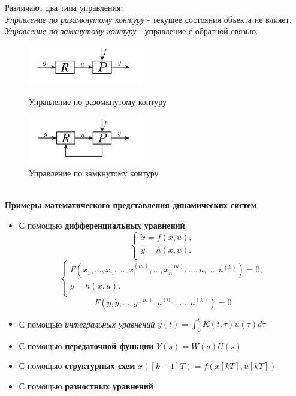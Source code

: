 \documentclass[A4]{article}
\begin{document}
\noindent Различают два типа управления:\\
\emph{Управление по разомкнутому контуру} - текущее состояния объекта не влияет.\\
\emph{Управление по замкнутому контуру} - управление с обратной связью.
\begin{figure}[htbp] 
	\centering 
	\begin{minipage}[t]{0.48\textwidth} 
		\centering 
		\includegraphics[width=5cm]{3} 
		\caption{Управление по разомкнутому контуру}
		\label{fig:3}
	\end{minipage} 
	\begin{minipage}[t]{0.48\textwidth} 
		\centering 
		\includegraphics[width=5cm]{4} 
		\caption{Управление по замкнутому контуру} 
		\label{fig:4}
	\end{minipage} 
\end{figure}
\\
\textbf{Примеры математического представления динамических систем}
\begin{itemize}
	\item С помощью \textbf{дифференциальных уравнений}
	\begin{equation}
	\left\{\begin{array}{cc}
	\dot{x}=f(x,u),\\
	\dot{y}=h(x,u).\\
	\end{array}\right.
	\end{equation}
	\begin{equation}
	\left\{\begin{array}{cc}
	F(x_1,\ldots,x_n,\ldots,x_1^{(m)},\ldots,x_n^{(m)},\ldots,u,\ldots,u^{(k)})=0,\\
	y=h(x,u).\\
	\end{array}\right.
	\end{equation}
	\begin{equation}
	F(y,\dot{y},\ldots,y^{(m)},u^{(0)},\ldots,u^{(k)})=0
	\end{equation}
	\item С помощью \emph{интегральных уравнений} $y(t)=\int_{0}^{t} K(t,\tau)u(\tau)d\tau$
	\item С помощью \textbf{передаточной функции} $Y(s)=W(s)U(s)$
	\item С помощью \textbf{структурных схем} $x([k+1]T)=f(x[kT],u[kT])$
	\item С помощью \textbf{разностных уравнений}
\end{itemize}
\end{document}
